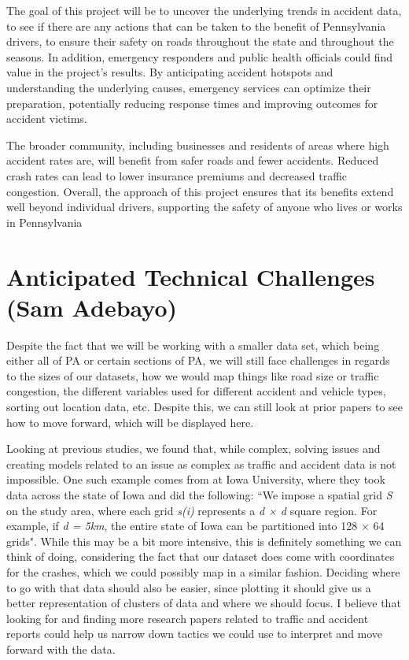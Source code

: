 \documentclass[journal]{IEEEtran}
\begin{document}
The goal of this project will be to uncover the underlying trends in accident data, to see if there are any actions that can be taken to the benefit of Pennsylvania drivers, to ensure their safety on roads throughout the state and throughout the seasons. 
In addition, emergency responders and public health officials could find value in the project’s results. By anticipating accident hotspots and understanding the underlying causes, emergency services can optimize their preparation, potentially reducing response times and improving outcomes for accident victims.

The broader community, including businesses and residents of areas where high accident rates are, will benefit from safer roads and fewer accidents. Reduced crash rates can lead to lower insurance premiums and decreased traffic congestion. Overall, the approach of this project ensures that its benefits extend well beyond individual drivers, supporting the safety of anyone who lives or works in Pennsylvania


\section{Anticipated Technical Challenges (Sam Adebayo)}
Despite the fact that we will be working with a smaller data set, which being either all of PA or certain sections of PA, we will still face challenges in regards to the sizes of our datasets, how we would map things like road size or traffic congestion,  the different variables used for different accident and vehicle types, sorting out location data, etc. Despite this, we can still look at prior papers to see how to move forward, which will be displayed here.

Looking at previous studies, we found that, while complex, solving issues and creating models related to an issue as complex as traffic and accident data is not impossible. One such example comes from \cite{10.1145/3219819.3219922} at Iowa University, where they took data across the state of Iowa and did the following: ``We impose a spatial grid \textit{S }on the study area, where each grid \textit{s(i)} represents a \textit{d × d} square region. For example, if \textit{d = 5km}, the entire state of Iowa can be partitioned into 128 × 64 grids". While this may be a bit more intensive, this is definitely something we can think of doing, considering the fact that our dataset does come with coordinates for the crashes, which we could possibly map in a similar fashion. Deciding where to go with that data should also be easier, since plotting it should give us a better representation of clusters of data and where we should focus. I believe that looking for and finding more research papers related to traffic and accident reports could help us narrow down tactics we could use to interpret and move forward with the data.
\end{document}
